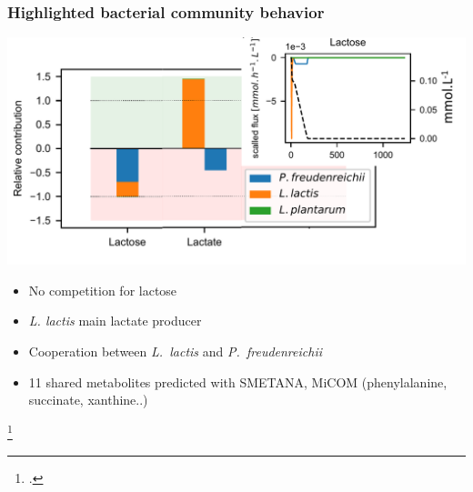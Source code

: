 \documentclass[8pt,usenames,dvipsnames]{beamer}
\def\freud{\textit{P.~freudenreichii}\xspace}
\def\lactis{\textit{L.~lactis}\xspace}
\begin{document}
\begin{frame}
\frametitle{Highlighted bacterial community behavior}
\includegraphics[width=\textwidth]{figures/relative-contribution.pdf}
\begin{minipage}{0.5\textwidth}

\begin{itemize}
\item No competition for lactose
\item \textit{L. lactis} main lactate producer 
\item Cooperation between \lactis and \freud
\end{itemize}

\end{minipage}%
\begin{minipage}{0.5\textwidth}
\begin{itemize}
\item 11 shared metabolites predicted with SMETANA, MiCOM (phenylalanine, succinate, xanthine..)
\end{itemize}
\end{minipage}

\footcite{Zelezniak2015,diener2020}
\end{frame}
\end{document}
